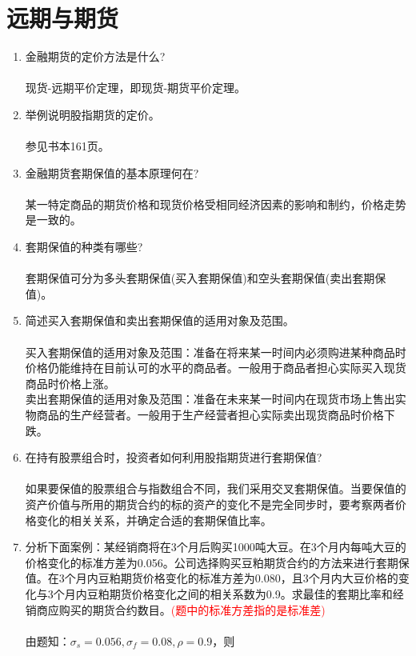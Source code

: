 \section{远期与期货}
\begin{enumerate}
    \item 金融期货的定价方法是什么?\\
    \sol\\
    现货-远期平价定理，即现货-期货平价定理。
    \item 举例说明股指期货的定价。\\
    \sol\\
    参见书本161页。
    \item 金融期货套期保值的基本原理何在?\\
    \sol\\
    某一特定商品的期货价格和现货价格受相同经济因素的影响和制约，价格走势是一致的。
    \item 套期保值的种类有哪些?\\
    \sol\\
    套期保值可分为多头套期保值(买入套期保值)和空头套期保值(卖出套期保值)。
    \item 简述买入套期保值和卖出套期保值的适用对象及范围。\\
    \sol\\
    买入套期保值的适用对象及范围：准备在将来某一时间内必须购进某种商品时价格仍能维持在目前认可的水平的商品者。一般用于商品者担心实际买入现货商品时价格上涨。\\
    卖出套期保值的适用对象及范围：准备在未来某一时间内在现货市场上售出实物商品的生产经营者。一般用于生产经营者担心实际卖出现货商品时价格下跌。
    \item 在持有股票组合时，投资者如何利用股指期货进行套期保值?\\
    \sol\\
    如果要保值的股票组合与指数组合不同，我们采用交叉套期保值。当要保值的资产价值与所用的期货合约的标的资产的变化不是完全同步时，要考察两者价格变化的相关关系，并确定合适的套期保值比率。
    \item 分析下面案例：某经销商将在3个月后购买1000吨大豆。在3个月内每吨大豆的价格变化的标准方差为0.056。公司选择购买豆粕期货合约的方法来进行套期保值。在3个月内豆粕期货价格变化的标准方差为0.080，且3个月内大豆价格的变化与3个月内豆粕期货价格变化之间的相关系数为0.9。求最佳的套期比率和经销商应购买的期货合约数目。\textcolor{red}{(题中的标准方差指的是标准差)}\\
    \sol\\
    由题知：$\sigma_s = 0.056, \sigma_f = 0.08, \rho = 0.9$，则

\end{enumerate}
